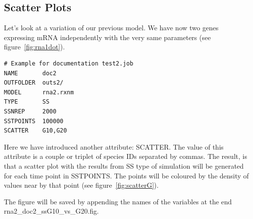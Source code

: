 \documentclass[letterpaper]{article}
\begin{document}
\subsection{Scatter Plots}

Let's look at a variation of our previous model. We have now two
genes expressing mRNA independently with the very same parameters (see
figure~\ref{fig:rna1dot}).

{\footnotesize
\begin{verbatim}
# Example for documentation test2.job
NAME       doc2
OUTFOLDER  outs2/
MODEL      rna2.rxnm
TYPE       SS
SSNREP     2000
SSTPOINTS  100000
SCATTER    G10,G20
\end{verbatim}
}

Here we have introduced another attribute: SCATTER. The value of this
attribute is a couple or triplet of species IDs separated by commas.
The result, is that a scatter plot with the results from SS type of
simulation will be generated for each time point in SSTPOINTS. The
points will be coloured by the density of values near by that point
(see figure~\ref{fig:scatterG}).

The figure will be saved by appending the names of the variables at
the end \textsf{rna2\_doc2\_ssG10\_vs\_G20.fig}.
\end{document}
